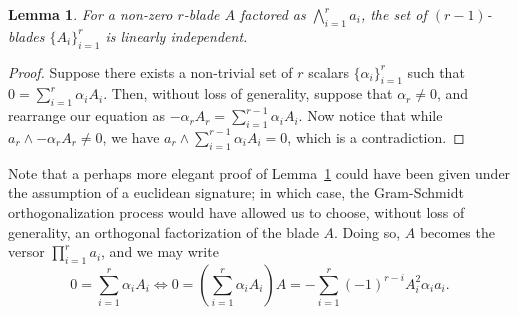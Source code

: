 \documentclass{birkjour}
\newtheorem{lem}[thm]{Lemma}
\theoremstyle{definition}
\theoremstyle{remark}
\numberwithin{equation}{section}
\begin{document}
\begin{lem}\label{lem_A_i_lin_indep}
For a non-zero $r$-blade $A$ factored as $\bigwedge_{i=1}^r a_i$, the set of
$(r-1)$-blades $\{A_i\}_{i=1}^r$ is linearly independent.
\end{lem}
\begin{proof}
Suppose there exists a non-trivial set of $r$ scalars $\{\alpha_i\}_{i=1}^r$
such that $0 = \sum_{i=1}^r\alpha_i A_i$.
Then, without loss of generality, suppose that $\alpha_r\neq 0$, and rearrange
our equation as $-\alpha_rA_r=\sum_{i=1}^{r-1}\alpha_iA_i$.  Now notice
that while $a_r\wedge-\alpha_rA_r\neq 0$, we have $a_r\wedge\sum_{i=1}^{r-1}\alpha_iA_i=0$,
which is a contradiction.
\end{proof}

Note that a perhaps more elegant proof of Lemma~\ref{lem_A_i_lin_indep} could have been given
under the assumption
of a euclidean signature; in which case, the Gram-Schmidt orthogonalization process would have
allowed us to choose, without loss of generality, an orthogonal factorization of the blade $A$.
Doing so, $A$ becomes the versor $\prod_{i=1}^r a_i$, and we may write
\begin{equation*}
0 = \sum_{i=1}^r \alpha_iA_i \iff
0=\left(\sum_{i=1}^r\alpha_iA_i\right)A = -\sum_{i=1}^r(-1)^{r-i}A_i^2\alpha_ia_i.
\end{equation*}



\begin{thebibliography}{9}

\end{thebibliography}
\end{document}
